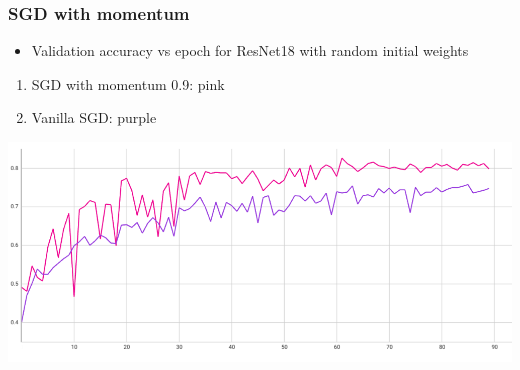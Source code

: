 \documentclass{beamer}
\begin{document}
\begin{frame}
    \frametitle{SGD with momentum}
    \begin{itemize}
        \item Validation accuracy vs epoch for ResNet18 with random initial weights
    \end{itemize}
    \begin{enumerate}
        \item SGD with momentum 0.9: pink
        \item Vanilla SGD: purple
    \end{enumerate}
\begin{center}
    \includegraphics[width=\textwidth]{figs/with-without-momentum.png}
\end{center}
    

\end{frame}
\end{document}
